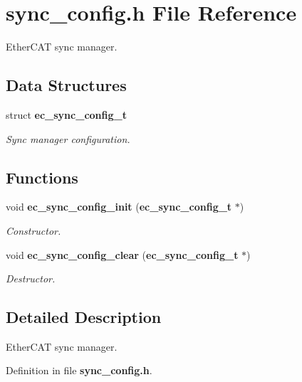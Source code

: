 \section{sync\-\_\-config.\-h File Reference}
\label{sync__config_8h}


Ether\-C\-A\-T sync manager.  


\subsection*{Data Structures}
\begin{DoxyCompactItemize}
\item 
struct {\bf ec\-\_\-sync\-\_\-config\-\_\-t}
\begin{DoxyCompactList}\small\item\em Sync manager configuration. \end{DoxyCompactList}\end{DoxyCompactItemize}
\subsection*{Functions}
\begin{DoxyCompactItemize}
\item 
void {\bf ec\-\_\-sync\-\_\-config\-\_\-init} ({\bf ec\-\_\-sync\-\_\-config\-\_\-t} $\ast$)\label{sync__config_8h_a7a8aef074c9e63236438779f47342406}

\begin{DoxyCompactList}\small\item\em Constructor. \end{DoxyCompactList}\item 
void {\bf ec\-\_\-sync\-\_\-config\-\_\-clear} ({\bf ec\-\_\-sync\-\_\-config\-\_\-t} $\ast$)\label{sync__config_8h_aa601ea25957e293659f5ab2512beeab9}

\begin{DoxyCompactList}\small\item\em Destructor. \end{DoxyCompactList}\end{DoxyCompactItemize}


\subsection{Detailed Description}
Ether\-C\-A\-T sync manager. 

Definition in file {\bf sync\-\_\-config.\-h}.

